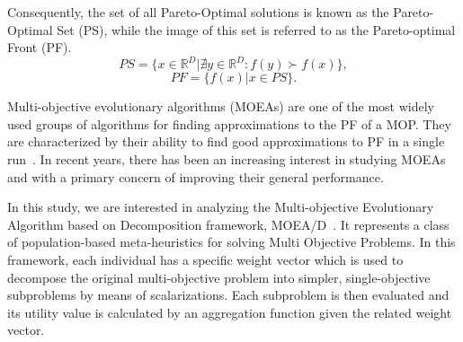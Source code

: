 Consequently, the set of all Pareto-Optimal solutions is known as the Pareto-Optimal Set (PS), while the image of this set is referred to as the Pareto-optimal Front (PF).\\
\vspace{-1em}
\begin{equation}
PS = \{x \in \mathbb{R}^{D} | \nexists y \in \mathbb{R}^{D} : f(y) \succ f(x)  \},
\end{equation}
\vspace{-1em}
\begin{equation}
PF = \{f(x) | x \in PS \}.
\end{equation}

Multi-objective evolutionary algorithms (MOEAs) are one of the most widely used groups of algorithms for finding approximations to the PF of a MOP. They are characterized by their ability to find good approximations to PF in a single run~\cite{zhou2011multiobjective}. In recent years, there has been an increasing interest in studying MOEAs and with a primary concern of improving their general performance.%


In this study, we are interested in analyzing the Multi-objective Evolutionary Algorithm based on Decomposition framework, MOEA/D~\cite{zhang2007moea}. It represents a class of population-based meta-heuristics for solving Multi Objective Problems. In
this framework, each individual has a specific weight vector which is used to decompose the original multi-objective problem into simpler, single-objective subproblems by means of scalarizations. Each subproblem is then evaluated and its utility value is calculated by an aggregation function given the related weight vector. 


